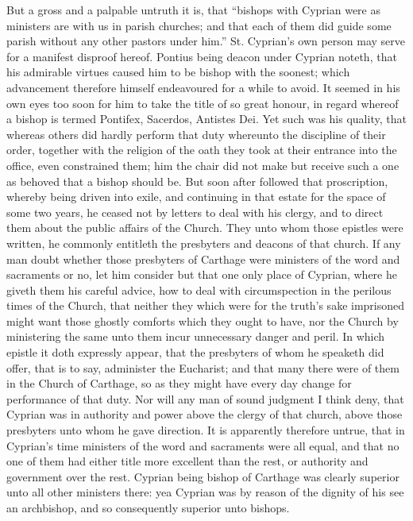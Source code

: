 But a gross and a palpable untruth it is, that “bishops with Cyprian were as ministers are with us in parish churches; and that each of them did guide some parish without any other pastors under him.” St. Cyprian’s own person may serve for a manifest disproof hereof. Pontius being deacon under Cyprian noteth, that his admirable virtues caused him to be bishop with the soonest; which advancement therefore himself endeavoured for a while to avoid. It seemed in his own eyes too soon for him to take the title of so great honour, in regard whereof a bishop is termed Pontifex, Sacerdos, Antistes Dei. Yet such was his quality, that whereas others did hardly perform that duty whereunto the discipline of their order, together with the religion of the oath they took at their entrance into the office, even constrained them; him the chair did not make but receive such a one as behoved that a bishop should be. But soon after followed that proscription, whereby being driven into exile, and continuing in that estate for the space of some two years, he ceased not by letters to deal with his clergy, and to direct  them about the public affairs of the Church.
 They unto whom those epistles were written, he commonly entitleth the presbyters and deacons of that church. If any man doubt whether those presbyters of Carthage were ministers of the word and sacraments or no, let him consider but that one only place of Cyprian, where he giveth them his careful advice, how to deal with circumspection in the perilous times of the Church, that neither they which were for the truth’s sake imprisoned might want those ghostly comforts which they ought to have, nor the Church by ministering the same unto them incur unnecessary danger and peril. In which epistle it doth expressly appear, that the presbyters of whom he speaketh did offer, that is to say, administer the Eucharist; and that many there were of them in the Church of Carthage, so as they might have every day change for performance of that duty. Nor will any man of sound judgment I think deny, that Cyprian was in authority and power above the clergy of that church, above those presbyters unto whom he gave direction. It is apparently therefore untrue, that in Cyprian’s time ministers of the word and sacraments were all equal, and that no one of them had either title more excellent than the rest, or authority and government over the rest. Cyprian being bishop of Carthage was clearly superior unto all other ministers there: yea Cyprian was by reason of the dignity of his see an archbishop, and so consequently superior unto bishops.

